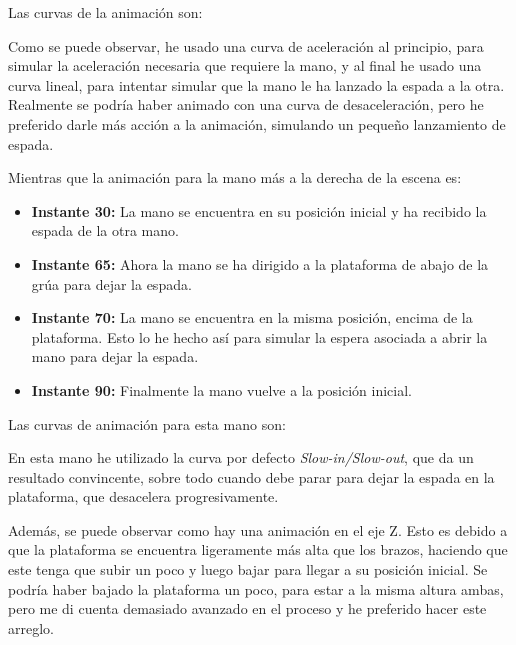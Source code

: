 Las curvas de la animación son:



Como se puede observar, he usado una curva de aceleración al principio, para simular la aceleración necesaria que requiere la mano, y al final he usado una curva lineal, para intentar simular que la mano le ha lanzado la espada a la otra. Realmente se podría haber animado con una curva de desaceleración, pero he preferido darle más acción a la animación, simulando un pequeño lanzamiento de espada.


Mientras que la animación para la mano más a la derecha de la escena es: 

\begin{itemize}
    \item \textbf{Instante 30: }La mano se encuentra en su posición inicial y ha recibido la espada de la otra mano.
    \item \textbf{Instante 65: }Ahora la mano se ha dirigido a la plataforma de abajo de la grúa para dejar la espada.
    \item \textbf{Instante 70: }La mano se encuentra en la misma posición, encima de la plataforma. Esto lo he hecho así para simular la espera asociada a abrir la mano para dejar la espada.
    \item \textbf{Instante 90: }Finalmente la mano vuelve a la posición inicial.
\end{itemize}

Las curvas de animación para esta mano son:


En esta mano he utilizado la curva por defecto \textit{Slow-in/Slow-out}, que da un resultado convincente, sobre todo cuando debe parar para dejar la espada en la plataforma, que desacelera progresivamente.

\bigskip

Además, se puede observar como hay una animación en el eje Z. Esto es debido a que la plataforma se encuentra ligeramente más alta que los brazos, haciendo que este tenga que subir un poco y luego bajar para llegar a su posición inicial. Se podría haber bajado la plataforma un poco, para estar a la misma altura ambas, pero me di cuenta demasiado avanzado en el proceso y he preferido hacer este arreglo.

